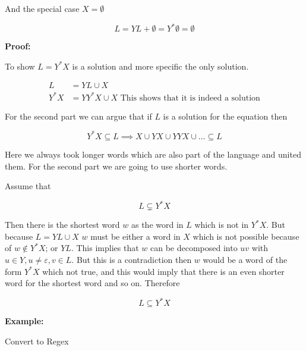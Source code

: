 And the special case \(X = \emptyset\)

\[
L = YL + \emptyset = Y^* \emptyset = \emptyset
\]

\textbf{Proof:}

To show \(L = Y^*X\) is a solution and more specific the only solution.

\begin{align*}
    L &= YL \cup X\\
    Y^*X &= YY^*X \cup X \text{ This shows that it is indeed a solution}
\end{align*}

For the second part we can argue that if \(L\) is a solution for the equation then 

\[
    Y^*X \subseteq L \implies X \cup YX \cup YYX \cup \dots \subseteq L
\]

Here we always took longer words which are also part of the language and united them. For the second 
part we are going to use shorter words.

Assume that

\[
    L \subsetneq Y^*X 
\]

Then there is the shortest word \(w\) as the word in \(L\) which is not in \(Y^*X\). But 
because \(L = YL \cup X\) \(w\) must be either a word in \(X\) which is not possible because of 
\(w \notin Y^*X\); or \(YL\). This implies that \(w\) can be decomposed into \(uv\) with 
\(u \in Y, u \neq \varepsilon, v \in L\). But this is a contradiction then \(w\) would be a word of the 
form \(Y^*X\) which not true, and this would imply that there is an even shorter word for the shortest word 
and so on. Therefore 

\[
    L \subseteq Y^*X  
\]

\QED

\textbf{Example:}

Convert to Regex

\begin{center}
\end{center}

